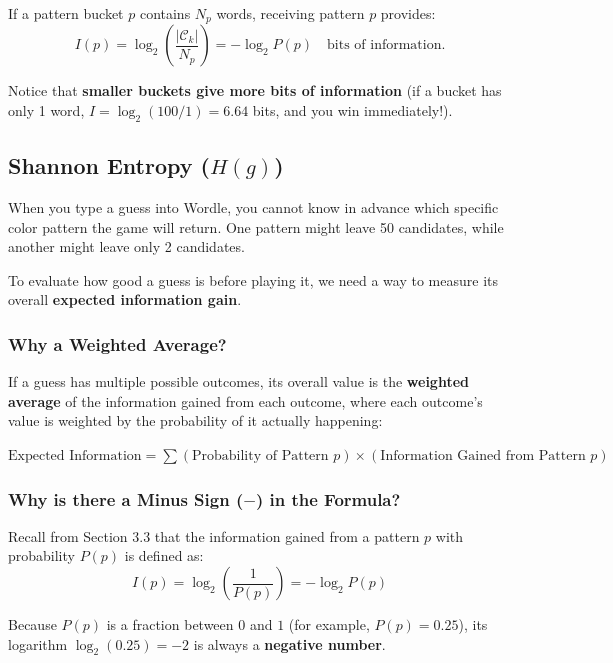 \documentclass[11pt,a4paper]{article}
\begin{document}
If a pattern bucket $p$ contains $N_p$ words, receiving pattern $p$ provides:
\begin{equation}
I(p) = \log_2 \left( \frac{|\mathcal{C}_k|}{N_p} \right) = -\log_2 P(p) \quad \text{bits of information.}
\end{equation}

Notice that \textbf{smaller buckets give more bits of information} (if a bucket has only 1 word, $I = \log_2(100/1) = 6.64$ bits, and you win immediately!).

\subsection{\texorpdfstring{Shannon Entropy ($H(g)$)}{Shannon Entropy}}
When you type a guess into Wordle, you cannot know in advance which specific color pattern the game will return. One pattern might leave 50 candidates, while another might leave only 2 candidates.

To evaluate how good a guess is before playing it, we need a way to measure its overall \textbf{expected information gain}.

\subsubsection*{Why a Weighted Average?}
If a guess has multiple possible outcomes, its overall value is the \textbf{weighted average} of the information gained from each outcome, where each outcome's value is weighted by the probability of it actually happening:
\begin{center}
$\text{Expected Information} = \sum (\text{Probability of Pattern } p) \times (\text{Information Gained from Pattern } p)$
\end{center}

\subsubsection*{Why is there a Minus Sign ($-$) in the Formula?}
Recall from Section 3.3 that the information gained from a pattern $p$ with probability $P(p)$ is defined as:
\begin{equation}
I(p) = \log_2 \left( \frac{1}{P(p)} \right) = -\log_2 P(p)
\end{equation}

Because $P(p)$ is a fraction between $0$ and $1$ (for example, $P(p) = 0.25$), its logarithm $\log_2(0.25) = -2$ is always a \textbf{negative number}. 
\end{document}
